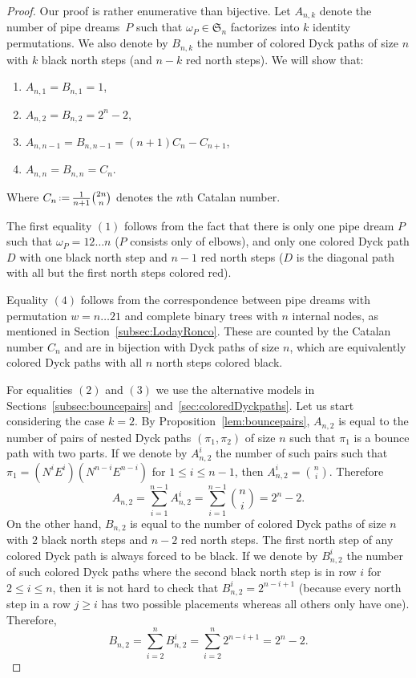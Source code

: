 \documentclass{amsart}
\theoremstyle{definition}
\newcommand{\eqdef}{\mbox{\,\raisebox{0.2ex}{\scriptsize\ensuremath{\mathrm:}}\ensuremath{=}\,}} %
\begin{document}
\begin{proof}
Our proof is rather enumerative than bijective. 
Let $A_{n,k}$ denote the number of pipe dreams~$P$ such that $\omega_P\in \mathfrak{S}_n$ factorizes into $k$ identity permutations.
We also denote by $B_{n,k}$ the number of colored Dyck paths of size $n$ with $k$ black north steps (and $n-k$ red north steps). 
We will show that:

\begin{enumerate}
\item $A_{n,1}=B_{n,1}=1$,
\item $A_{n,2}=B_{n,2}=2^n-2$,
\item $A_{n,n-1}=B_{n,n-1}=(n+1)C_n-C_{n+1}$,
\item $A_{n,n}=B_{n,n}=C_n$.
\end{enumerate}
Where $C_n \eqdef \frac{1}{n+1}{2n \choose n}$ denotes the $n$th Catalan number.

The first equality $(1)$ follows from the fact that there is only one pipe dream $P$ such that $\omega_P=12\dots n$ ($P$ consists only of elbows), and only one colored Dyck path $D$ with one black north step and $n-1$ red north steps ($D$ is the diagonal path with all but the first north steps colored red).

Equality $(4)$ follows from the correspondence between pipe dreams with permutation ${w = n \dots 2 1}$ and complete binary trees with $n$ internal nodes, as mentioned in Section~\ref{subsec:LodayRonco}. 
These are counted by the Catalan number $C_n$ and are in bijection with Dyck paths of size $n$, which are equivalently colored Dyck paths with all $n$ north steps colored black.

For equalities $(2)$ and $(3)$ we use the alternative models in Sections~\ref{subsec:bouncepairs} and~\ref{sec:coloredDyckpaths}.  
Let us start considering the case $k=2$. By Proposition~\ref{lem:bouncepairs}, $A_{n,2}$ is equal to the number of pairs of nested Dyck paths $(\pi_1,\pi_2)$ of size $n$ such that $\pi_1$ is a bounce path with two parts. If we denote by $A_{n,2}^i$ the number of such pairs such that $\pi_1=(N^iE^i)(N^{n-i}E^{n-i})$ for $1\leq i \leq n-1$, then $A_{n,2}^i={n \choose i}$. Therefore 
\[
A_{n,2}= \sum_{i=1}^{n-1} A_{n,2}^i =  \sum_{i=1}^{n-1} {n \choose i} = 2^n-2.
\]
On the other hand, $B_{n,2}$ is equal to the number of colored Dyck paths of size $n$ with $2$ black north steps and $n-2$ red north steps. 
The first north step of any colored Dyck path is always forced to be black. If we denote by $B_{n,2}^i$ the number of such colored Dyck paths where the second black north step is in row $i$ for $2\leq i \leq n$, then it is not hard to check that $B_{n,2}^i=2^{n-i+1}$ (because every north step in a row $j\geq i$ has two possible placements whereas all others only have one). Therefore, 
\[
B_{n,2}= \sum_{i=2}^{n} B_{n,2}^i =  \sum_{i=2}^{n} 2^{n-i+1} = 2^n-2.
\]


\end{proof}
\end{document}
